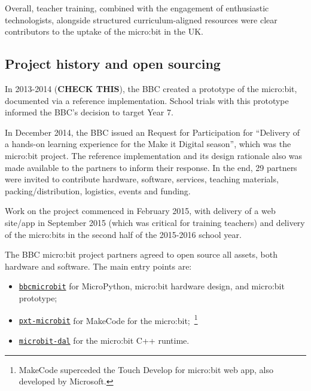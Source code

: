 Overall, teacher training, combined with the engagement of enthusiastic technologists, alongside structured curriculum-aligned resources were clear contributors to the uptake of the micro:bit in the UK.

\subsection{Project history and open sourcing}



In 2013-2014 ({\bf CHECK THIS}), the BBC created a prototype of the micro:bit, 
documented via a reference implementation. School trials with this prototype 
informed the BBC's decision to target Year 7. 

In December 2014, the BBC issued an Request for Participation
for ``Delivery of a hands-on learning experience for the Make it Digital season'',
which was the micro:bit project.
The reference implementation and
its design rationale also was made available to the partners to inform
their response.
In the end, 29 partners were invited to contribute hardware, software, services,
teaching materials, packing/distribution, logistics, events and funding.

Work on the project commenced in February 2015, with delivery of
a web site/app in September 2015 (which was critical
for training teachers) and delivery of the micro:bits in the second
half of the 2015-2016 school year.

The BBC micro:bit project partners agreed to open source all assets, both
hardware and software. The main entry points are:
\begin{itemize}
\item {\tt \href{https://github.com/bbcmicrobit}{bbcmicrobit}} for MicroPython, micro:bit hardware design, and micro:bit prototype;
\item {\tt \href{https://github.com/microsoft/pxt-microbit}{pxt-microbit}} for MakeCode for the micro:bit;~\footnote{
MakeCode superceded the Touch Develop for micro:bit web app,\cite{ball2016microsoft} also developed by Microsoft.}
\item {\tt \href{https://github.com/lancaster-university/microbit-dal}{microbit-dal}}             for the micro:bit
C++ runtime.
\end{itemize}

